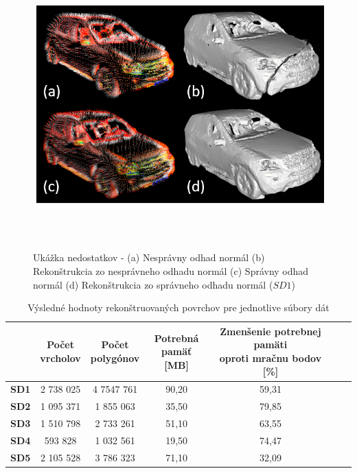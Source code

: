 \begin{figure}[!htbp]
  \centering
  \includegraphics[width=16cm, height=11cm]{img/mesh_bad_normals.png}
  \caption{Ukážka nedostatkov - (a) Nesprávny odhad normál (b) Rekonštrukcia zo nesprávneho odhadu normál (c) Správny odhad normál (d) Rekonštrukcia zo správneho odhadu normál ($SD1$)} 
  \label{fig:mesh_bad_normals}
\end{figure} 

\begin{table}
  \begin{center} %
      \begin{tabular}{|c || c | c | c | c | c| c|} 
       \hline
        & \thead{Počet \\ vrcholov} &
          \thead{Počet \\ polygónov} &
          \thead{Potrebná \\ pamäť [MB]} &
          \thead{Zmenšenie potrebnej pamäti \\ oproti mračnu bodov [\%]} \\ [0.5ex]    
       \hline\hline
       \textbf{SD1} & 2 738 025  & 4 7547 761 & 90,20 & 59,31 \\ 
       \hline
       \textbf{SD2} & 1 095 371  & 1 855 063 & 35,50 & 79,85 \\
       \hline
       \textbf{SD3} &  1 510 798  & 2 733 261 & 51,10 & 63,55 \\
       \hline
       \textbf{SD4} & 593 828  & 1 032 561 & 19,50 & 74,47 \\
       \hline
       \textbf{SD5} & 2 105 528  & 3 786 323 & 71,10 & 32,09 \\ 
       \hline
      \end{tabular}
  \caption{Výsledné hodnoty rekonštruovaných povrchov pre jednotlive súbory dát}
  \label{table:mesh_results}
  \end{center}
\end{table}

